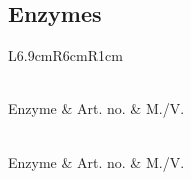 \subsection{Enzymes}
{
\setlength{\tabcolsep}{5pt}
\begin{longtable}{L{6.9cm}R{6cm}R{1cm}}
	\caption[List of Enzymes Used in This Work]{List of enzymes used in this work. Abbreviations: Art. no.: Article number; M./V.: Manufacturer or vendor.\label{tbl-mat-enz}}\\
	\toprule
	{Enzyme} & {Art. no.} & {M./V.} \\
	\hline \endfirsthead
	\caption[]{\textit{continued from the previous page}} \\
	\toprule
	{Enzyme} & {Art. no.} & {M./V.} \\
	\hline \endhead
	\hline
	 \\
	\endfoot
	\bottomrule
	\endlastfoot
\end{longtable}
}

